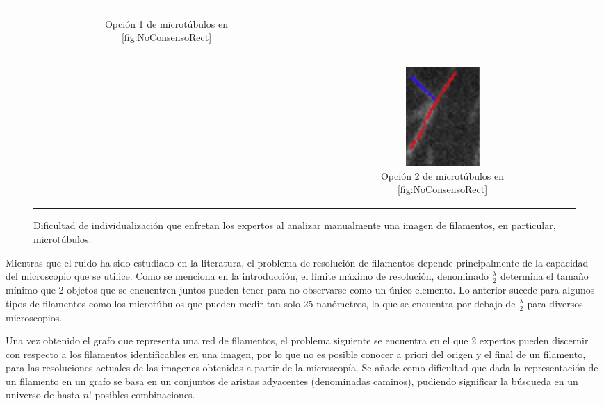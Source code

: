 \begin{figure}[h]
\begin{tabular}{c c c}
\begin{subfigure}[t]{0.21\textwidth}
        \caption{Opci\'on 1 de microt\'ubulos en \ref{fig:NoConsensoRect}}
        \label{fig:NoConsensoOpcion1}
        \end{subfigure} \\
        & &
        \begin{subfigure}[b]{0.21\textwidth}
        \includegraphics[scale=0.8]{imagenes/NoConsenso4.png}
        \caption{Opci\'on 2 de microt\'ubulos en \ref{fig:NoConsensoRect}}
        \label{fig:NoConsensoOpcion2}
        \end{subfigure} \\
    \end{tabular}
    
    \caption{Dificultad de individualizaci\'on que enfretan los expertos al analizar manualmente una imagen de filamentos, en particular, microt\'ubulos.}
    \label{fig:NoConsenso}
\end{figure}

Mientras que el ruido ha sido estudiado en la literatura, el problema de resoluci\'on de filamentos depende principalmente de la capacidad del microscopio que se utilice. Como se menciona en la introducci\'on, el l\'imite m\'aximo de resoluci\'on, denominado $\frac{\lambda}{2}$ determina  el tama\~no m\'inimo que 2 objetos que se encuentren juntos pueden tener para no observarse como un \'unico elemento. Lo anterior sucede para algunos tipos de filamentos como los microt\'ubulos que pueden medir tan solo 25 nan\'ometros, lo que se encuentra por debajo de $\frac{\lambda}{2}$ para diversos microscopios. 



Una vez obtenido el grafo que representa una red de filamentos, el problema siguiente se encuentra en el que 2 expertos pueden discernir con respecto a los filamentos identificables en una imagen, por lo que no es posible conocer a priori del origen y el final de un filamento, para las resoluciones actuales de las imagenes obtenidas a partir de la microscop\'ia. Se añade como dificultad que dada la representaci\'on de un filamento en un grafo se basa en un conjuntos de aristas adyacentes (denominadas caminos), pudiendo significar la b\'usqueda en un universo de hasta $n!$ posibles combinaciones.

